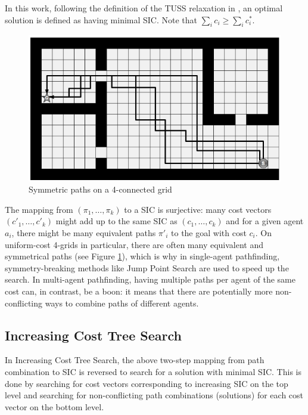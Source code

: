 \documentclass[english,10pt]{article}
\begin{document}
	In this work, following the definition of the TUSS relaxation in \cite{mulderij2020}, an optimal solution is defined as having minimal SIC. Note that $\sum_i c_i \geq \sum_i c^*_i$.
	\begin{figure}
		\centering
		\includegraphics[width=\linewidth]{img/symmetries}
		\caption{Symmetric paths on a 4-connected grid\cite{harabor2010}}
		\label{fig:symmetries}
		\vspace{-10pt}
	\end{figure}
	The mapping from $(\pi_1,\ldots,\pi_k)$ to a SIC is surjective: many cost vectors $(c'_1,\ldots,c'_k)$ might add up to the same SIC as $(c_1,\ldots,c_k)$ and for a given agent $a_i$, there might be many equivalent paths $\pi'_i$ to the goal with cost $c_i$. On uniform-cost 4-grids in particular, there are often many equivalent and symmetrical paths\cite{harabor2010} (see Figure \ref{fig:symmetries}), which is why in single-agent pathfinding, symmetry-breaking methods like Jump Point Search\cite{harabor2011} are used to speed up the search. In multi-agent pathfinding, having multiple paths per agent of the same cost can, in contrast, be a boon: it means that there are potentially more non-conflicting ways to combine paths of different agents.
	\subsection{Increasing Cost Tree Search}
	\label{icts}
	In Increasing Cost Tree Search\cite{sharon2011}, the above two-step mapping from path combination to SIC is reversed to search for a solution with minimal SIC. This is done by searching for cost vectors corresponding to increasing SIC on the top level and searching for non-conflicting path combinations (solutions) for each cost vector on the bottom level. 
	
\end{document}
